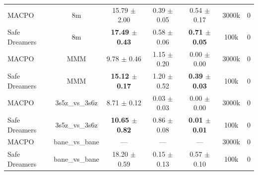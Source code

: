 \documentclass{article}
\begin{document}
\begin{longtable}{lcccccc}
\midrule
MACPO & 8m & 15.79 $\pm$ 2.00 & 0.39 $\pm$ 0.05 & 0.54 $\pm$ 0.17 & 3000k & 0 \\
Safe Dreamers & 8m & \textbf{17.49 $\pm$ 0.43} & 0.58 $\pm$ 0.06 & \textbf{0.71 $\pm$ 0.05} & 100k & 0 \\
\midrule
MACPO & MMM & 9.78 $\pm$ 0.46 & 1.15 $\pm$ 0.20 & 0.00 $\pm$ 0.00 & 3000k & 0 \\
Safe Dreamers & MMM & \textbf{15.12 $\pm$ 0.17} & 1.20 $\pm$ 0.52 & \textbf{0.39 $\pm$ 0.03} & 100k & 0 \\
\midrule
MACPO & 3s5z\_vs\_3s6z & 8.71 $\pm$ 0.12 & 0.03 $\pm$ 0.03 & 0.00 $\pm$ 0.00 & 3000k & 0 \\
Safe Dreamers & 3s5z\_vs\_3s6z & \textbf{10.65 $\pm$ 0.82} & 0.86 $\pm$ 0.08 & \textbf{0.01 $\pm$ 0.01} & 100k & 0 \\
\midrule
MACPO & bane\_vs\_bane & — & — & — & 3000k & 0 \\
Safe Dreamers & bane\_vs\_bane & 18.20 $\pm$ 0.59 & 0.15 $\pm$ 0.13 & 0.57 $\pm$ 0.10 & 100k & 0 \\
\end{longtable}
\end{document}
